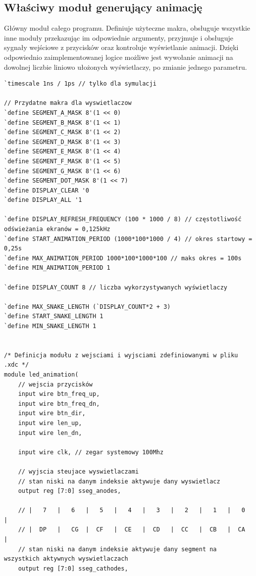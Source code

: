 \documentclass[a4paper]{article}
\begin{document}
\subsection{Właściwy moduł generujący animację}
Główny moduł całego programu. Definiuje użyteczne makra, obsługuje wszystkie inne moduły
przekazując im odpowiednie argumenty,
przyjmuje i obsługuje sygnały wejściowe z przycisków oraz kontroluje
wyświetlanie animacji.
Dzięki odpowiednio zaimplementowanej logice możliwe jest wywołanie animacji na dowolnej liczbie liniowo ułożonych 
wyświetlaczy, po zmianie jednego parametru. 


\begin{verbatim}
`timescale 1ns / 1ps // tylko dla symulacji

// Przydatne makra dla wyswietlaczow
`define SEGMENT_A_MASK 8'(1 << 0)
`define SEGMENT_B_MASK 8'(1 << 1)
`define SEGMENT_C_MASK 8'(1 << 2)
`define SEGMENT_D_MASK 8'(1 << 3)
`define SEGMENT_E_MASK 8'(1 << 4)
`define SEGMENT_F_MASK 8'(1 << 5)
`define SEGMENT_G_MASK 8'(1 << 6)
`define SEGMENT_DOT_MASK 8'(1 << 7)
`define DISPLAY_CLEAR '0
`define DISPLAY_ALL '1

`define DISPLAY_REFRESH_FREQUENCY (100 * 1000 / 8) // częstotliwość odświeżania ekranów = 0,125kHz
`define START_ANIMATION_PERIOD (1000*100*1000 / 4) // okres startowy = 0,25s
`define MAX_ANIMATION_PERIOD 1000*100*1000*100 // maks okres = 100s
`define MIN_ANIMATION_PERIOD 1

`define DISPLAY_COUNT 8 // liczba wykorzystywanych wyświetlaczy

`define MAX_SNAKE_LENGTH (`DISPLAY_COUNT*2 + 3)
`define START_SNAKE_LENGTH 1
`define MIN_SNAKE_LENGTH 1


/* Definicja modułu z wejsciami i wyjsciami zdefiniowanymi w pliku .xdc */
module led_animation(
    // wejscia przycisków
    input wire btn_freq_up,
    input wire btn_freq_dn,
    input wire btn_dir,
    input wire len_up,
    input wire len_dn,
    
    input wire clk, // zegar systemowy 100Mhz
    
    // wyjscia steujace wyswietlaczami
    // stan niski na danym indeksie aktywuje dany wyswietlacz
    output reg [7:0] sseg_anodes,
    
    // |   7   |   6   |   5   |   4   |   3   |   2   |   1   |   0   |
    // |  DP   |   CG  |  CF   |  CE   |  CD   |  CC   |  CB   |  CA   |
    // stan niski na danym indeksie aktywuje dany segment na wszystkich aktywnych wyswietlaczach
    output reg [7:0] sseg_cathodes,
    

\end{verbatim}
\end{document}

